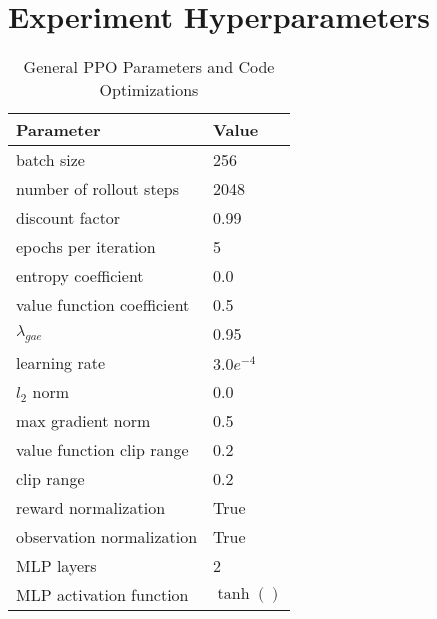 
\chapter{Experiment Hyperparameters}
\label{ch:Hyperparameters}
\begin{table}[ht!]
	\caption{General PPO Parameters \citep{SchulmanWDRK17} and Code Optimizations \citep{PPOHacks2020}}
	\vspace*{0.5cm}
	\centering
	\begin{tabular}{ll}
		\toprule
		Parameter & Value \\
        \midrule
        \midrule
		batch size & 256 \\
        number of rollout steps & 2048 \\
        discount factor & 0.99 \\
        epochs per iteration & 5 \\     
        entropy coefficient & 0.0 \\
        value function coefficient & 0.5 \\
        $\lambda_{gae}$ & 0.95 \\
        learning rate & $3.0e^{-4}$ \\
        $l_2$ norm & 0.0 \\
        max gradient norm & 0.5 \\
        value function clip range & 0.2 \\
        clip range & 0.2 \\
        reward normalization & True \\
        observation normalization & True \\
        \midrule
        MLP layers & 2\\
        MLP activation function & $\tanh()$\\
		\bottomrule
	\end{tabular}
\end{table}
